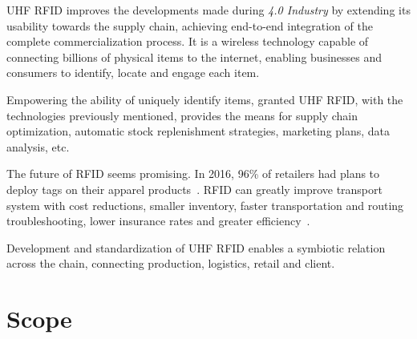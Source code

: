 \gls{UHF RFID} improves the developments made during \emph{4.0 Industry} by extending its usability towards the \gls{supply chain}, achieving end-to-end integration of the complete commercialization process. It is a wireless technology capable of connecting billions of physical items to the internet, enabling businesses and consumers to identify, locate and engage each item.

Empowering the ability of uniquely identify items, granted \gls{UHF RFID}, with the technologies previously mentioned, provides the means for \gls{supply chain} optimization, automatic stock replenishment strategies, marketing plans, data analysis, etc. 


The future of \gls{RFID} seems promising. In 2016, 96\% of retailers had plans to deploy tags on their apparel products~\cite{hardgrave2016StateRFID}. \gls{RFID} can greatly improve transport system with cost reductions, smaller inventory, faster transportation and routing troubleshooting, lower insurance rates and greater efficiency~\cite{oanaRFIDTechnologyContainers2013}.

Development and standardization of \gls{UHF RFID} enables a symbiotic relation across the chain, connecting production, logistics, retail and client.

\section{Scope}







